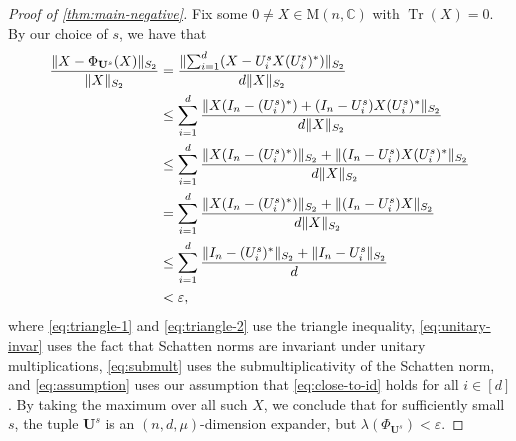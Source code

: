 \documentclass[11pt]{article}
\theoremstyle{plain}
\numberwithin{equation}{section}
\theoremstyle{definition}
\newcommand{\bC}{\mathbb{C}}
\DeclareMathOperator{\trace}{Tr}
\newcommand{\norm}[1]{\lVert#1\rVert}
\newcommand{\M}{\mathrm{M}}
\newcommand{\tuple}[1]{\mathbf{#1}}
\newcommand{\vU}{\tuple{U}}
\begin{document}
\begin{proof}[Proof of \cref{thm:main-negative}]
    Fix some $0 \neq X \in \M(n,\bC)$ with $\trace(X) =0$. By our choice of $s$, we have that
    \begingroup
    \allowdisplaybreaks
    \begin{align}
    \frac{\|X-\Phi_{\vU^s}(X)\|_{S_2}}{\norm{X}_{S_2}}
    &=\frac{\norm{\sum_{i=1}^{d}(X-U_i^s X(U_i^s)^*)}_{S_2}}{d\norm{X}_{S_2}} \notag\\
    &\leq\sum_{i=1}^{d}\frac{\norm{X(I_n-(U_i^s)^*)+(I_n-U_i^s)X(U_i^s)^*}_{S_2}}{d\norm{X}_{S_2}} \label{eq:triangle-1}\\
    &\leq\sum_{i=1}^{d}\frac{\norm{X(I_n-(U_i^s)^*)}_{S_2}+\norm{(I_n-U_i^s)X(U_i^s)^*}_{S_2}}{d\norm{X}_{S_2}}\label{eq:triangle-2}\\
    &=\sum_{i=1}^{d}\frac{\norm{X(I_n-(U_i^s)^*)}_{S_2} + \norm{(I_n-U_i^s)X}_{S_2}}{d\norm{X}_{S_2}}\label{eq:unitary-invar}\\
    &\leq \sum_{i=1}^d \frac{\norm{I_n-(U_i^s)^*}_{S_2} + \norm{I_n-U_i^s}_{S_2}}{d} \label{eq:submult}\\
    &<\varepsilon, \label{eq:assumption}
    \end{align}
    \endgroup
    where \eqref{eq:triangle-1} and \eqref{eq:triangle-2} use the triangle inequality, \eqref{eq:unitary-invar} uses the fact that Schatten norms are invariant under unitary multiplications, \eqref{eq:submult} uses the submultiplicativity of the Schatten norm, and \eqref{eq:assumption} uses our assumption that \eqref{eq:close-to-id} holds for all $i \in [d]$. By taking the maximum over all such $X$, we conclude that for sufficiently small $s$, the tuple $\vU^s$ is an $(n,d,\mu)$-dimension expander, but $\lambda(\Phi_{\vU^s}) < \varepsilon$.
\end{proof}
\end{document}
